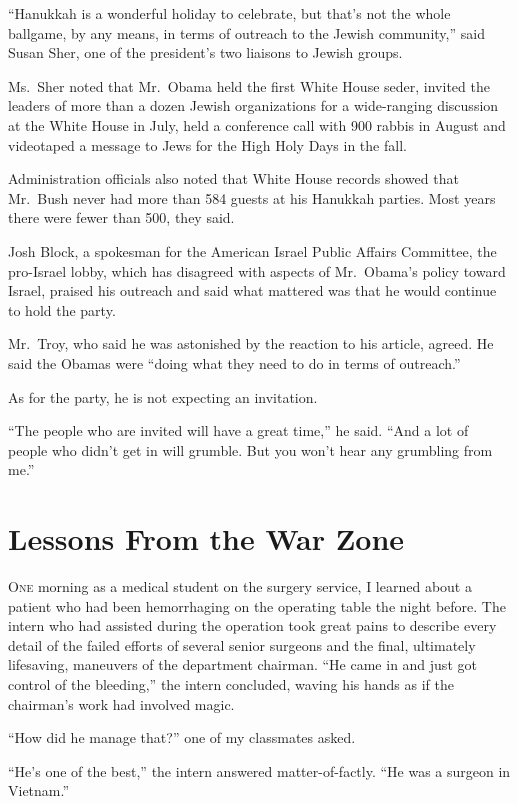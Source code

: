 ﻿\documentclass[12pt]{article}
\begin{document}
``Hanukkah is a wonderful holiday to celebrate, but that's not the whole ballgame, by any means, in
terms of outreach to the Jewish community,'' said Susan Sher, one of the president's two liaisons to
Jewish groups.

Ms.~Sher noted that Mr.~Obama held the first White House seder, invited the leaders of more than a
dozen Jewish organizations for a wide-ranging discussion at the White House in July, held a
conference call with 900 rabbis in August and videotaped a message to Jews for the High Holy Days in
the fall.

Administration officials also noted that White House records showed that Mr.~Bush never had more
than 584 guests at his Hanukkah parties. Most years there were fewer than 500, they said.

Josh Block, a spokesman for the American Israel Public Affairs Committee, the pro-Israel lobby,
which has disagreed with aspects of Mr.~Obama's policy toward Israel, praised his outreach and said
what mattered was that he would continue to hold the party.

Mr.~Troy, who said he was astonished by the reaction to his article, agreed. He said the Obamas were
``doing what they need to do in terms of outreach.''

As for the party, he is not expecting an invitation.

``The people who are invited will have a great time,'' he said. ``And a lot of people who didn't get
in will grumble. But you won't hear any grumbling from me.''

\section{Lessons From the War Zone}

\lettrine{O}{ne} morning as a medical student on the surgery service, I
learned about a patient who had been hemorrhaging on the operating table the night before. The
intern who had assisted during the operation took great pains to describe every detail of the failed
efforts of several senior surgeons and the final, ultimately lifesaving, maneuvers of the department
chairman. ``He came in and just got control of the bleeding,'' the intern concluded, waving his
hands as if the chairman's work had involved magic.

``How did he manage that?'' one of my classmates asked.

``He's one of the best,'' the intern answered matter-of-factly. ``He was a surgeon in Vietnam.''
\end{document}
